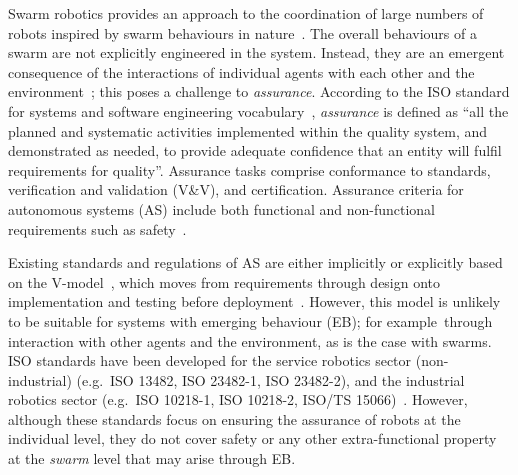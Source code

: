 \documentclass[runningheads]{llncs}
\begin{document}
Swarm robotics provides an approach to the coordination of large numbers of robots inspired by swarm behaviours in nature~\cite{Sahin2005}. 
The overall behaviours of a swarm are not explicitly engineered in the system. Instead, they are an emergent consequence of the interactions of individual agents with each other and the environment~\cite{Abeywickrama2022}; this poses a challenge to \emph{assurance}. 
According to the ISO standard for systems and software engineering vocabulary~\cite{ISO24765:2017}, \emph{assurance} is defined as ``all the planned and systematic activities implemented within the quality system, and demonstrated as needed, to provide adequate confidence that an entity will fulfil requirements for quality''. 
Assurance tasks comprise conformance to standards, verification and validation (V\&V), and certification. Assurance criteria for autonomous systems (AS) include both functional and non-functional requirements such as safety~\cite{Cheng2014}. 

Existing standards and regulations of AS are either implicitly or explicitly based on the V-model~\cite{Forsberg:1992}, which moves from requirements through design onto implementation and testing before deployment~\cite{Jia2021,Fisher2020}. 
However, this model is unlikely to be suitable for systems with emerging behaviour (EB); for example\ through interaction with other agents and the environment, as is the case with swarms. 
ISO standards have been developed for the service robotics sector (non-industrial) (e.g.\ ISO 13482, ISO 23482-1, ISO 23482-2), and the industrial robotics sector (e.g.\ ISO 10218-1, ISO 10218-2, ISO/TS 15066)~\cite{Abeywickrama2022}. 
However, although these %
standards focus on ensuring the assurance of robots at the individual level, they do not cover safety or any other extra-functional property at the \emph{swarm} level that may arise through EB. %
\end{document}
